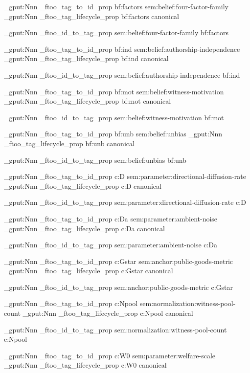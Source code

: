 \prop_gput:Nnn \g_ftoo_tag_to_id_prop { bf:factors } { sem:belief:four-factor-family }
\prop_gput:Nnn \g_ftoo_tag_lifecycle_prop { bf:factors } { canonical }

\prop_gput:Nnn \g_ftoo_id_to_tag_prop { sem:belief:four-factor-family } { bf:factors }


\prop_gput:Nnn \g_ftoo_tag_to_id_prop { bf:ind } { sem:belief:authorship-independence }
\prop_gput:Nnn \g_ftoo_tag_lifecycle_prop { bf:ind } { canonical }

\prop_gput:Nnn \g_ftoo_id_to_tag_prop { sem:belief:authorship-independence } { bf:ind }


\prop_gput:Nnn \g_ftoo_tag_to_id_prop { bf:mot } { sem:belief:witness-motivation }
\prop_gput:Nnn \g_ftoo_tag_lifecycle_prop { bf:mot } { canonical }

\prop_gput:Nnn \g_ftoo_id_to_tag_prop { sem:belief:witness-motivation } { bf:mot }


\prop_gput:Nnn \g_ftoo_tag_to_id_prop { bf:unb } { sem:belief:unbias }
\prop_gput:Nnn \g_ftoo_tag_lifecycle_prop { bf:unb } { canonical }

\prop_gput:Nnn \g_ftoo_id_to_tag_prop { sem:belief:unbias } { bf:unb }


\prop_gput:Nnn \g_ftoo_tag_to_id_prop { c:D } { sem:parameter:directional-diffusion-rate }
\prop_gput:Nnn \g_ftoo_tag_lifecycle_prop { c:D } { canonical }

\prop_gput:Nnn \g_ftoo_id_to_tag_prop { sem:parameter:directional-diffusion-rate } { c:D }


\prop_gput:Nnn \g_ftoo_tag_to_id_prop { c:Da } { sem:parameter:ambient-noise }
\prop_gput:Nnn \g_ftoo_tag_lifecycle_prop { c:Da } { canonical }

\prop_gput:Nnn \g_ftoo_id_to_tag_prop { sem:parameter:ambient-noise } { c:Da }


\prop_gput:Nnn \g_ftoo_tag_to_id_prop { c:Gstar } { sem:anchor:public-goods-metric }
\prop_gput:Nnn \g_ftoo_tag_lifecycle_prop { c:Gstar } { canonical }

\prop_gput:Nnn \g_ftoo_id_to_tag_prop { sem:anchor:public-goods-metric } { c:Gstar }


\prop_gput:Nnn \g_ftoo_tag_to_id_prop { c:Npool } { sem:normalization:witness-pool-count }
\prop_gput:Nnn \g_ftoo_tag_lifecycle_prop { c:Npool } { canonical }

\prop_gput:Nnn \g_ftoo_id_to_tag_prop { sem:normalization:witness-pool-count } { c:Npool }


\prop_gput:Nnn \g_ftoo_tag_to_id_prop { c:W0 } { sem:parameter:welfare-scale }
\prop_gput:Nnn \g_ftoo_tag_lifecycle_prop { c:W0 } { canonical }

